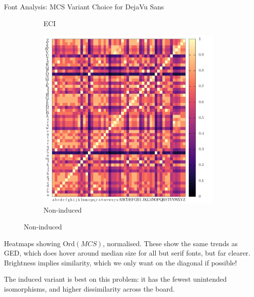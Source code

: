 \documentclass[10pt]{beamer}
\begin{document}
\begin{frame}{Font Analysis: MCS Variant Choice for DejaVu Sans}
\begin{figure}
\begin{subfigure}[b]{0.3\linewidth}
			\caption{
				ECI
				\label{fig:heat:filter:eci}
			}
		\end{subfigure}
		\begin{subfigure}[b]{0.3\linewidth}
			\includegraphics[width=\linewidth, height=0.9\linewidth]{../tables/dejavu-sans/edgecountdec-conf-nrm.pdf}
			\caption{
				Non-induced
				\label{fig:heat:filter:non-ind}
			}
		\end{subfigure}
	\end{figure}

	Heatmaps showing $\text{Ord}(\textit{MCS})$, normalised.
	These show the same trends as GED, which does hover around median size for all but serif fonts, but far clearer.
	Brightness implies similarity, which we only want on the diagonal if possible!
	
	The \alert{induced variant is best on this problem}: it has the fewest unintended isomorphisms, and higher dissimilarity across the board.
\end{frame}
\end{document}
